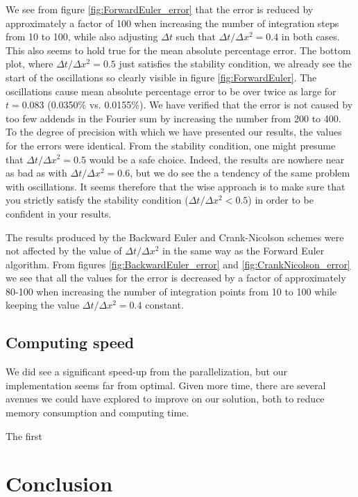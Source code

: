 \documentclass[reprint, english,notitlepage,nofootinbib]{revtex4-1}  %
\begin{document}
We see from figure \ref{fig:ForwardEuler_error} that the error is reduced by approximately a factor of 100 when increasing the number of integration steps from 10 to 100, while also adjusting \(\Delta t\) such that \(\Delta t / \Delta x^2 = 0.4\) in both cases. This also seems to hold true for the mean absolute percentage error. The bottom plot, where \(\Delta t / \Delta x^2 = 0.5\) just satisfies the stability condition, we already see the start of the oscillations so clearly visible in figure \ref{fig:ForwardEuler}. The oscillations cause mean absolute percentage error to be over twice as large for \(t = 0.083\) (0.0350\% vs. 0.0155\%). We have verified that the error is not caused by too few addends in the Fourier sum by increasing the number from 200 to 400. To the degree of precision with which we have presented our results, the values for the errors were identical.
From the stability condition, one might presume that \(\Delta t / \Delta x^2 = 0.5\) would be a safe choice. Indeed, the results are nowhere near as bad as with \(\Delta t / \Delta x^2 = 0.6\), but we do see the a tendency of the same problem with oscillations. It seems therefore that the wise approach is to make sure that you strictly satisfy the stability condition (\(\Delta t / \Delta x^2 < 0.5\)) in order to be confident in your results.

The results produced by the Backward Euler and Crank-Nicolson schemes were not affected by the value of \(\Delta t / \Delta x^2\) in the same way as the Forward Euler algorithm. From figures \ref{fig:BackwardEuler_error} and \ref{fig:CrankNicolson_error} we see that all the values for the error is decreased by a factor of approximately 80-100 when increasing the number of integration points from 10 to 100 while keeping the value \(\Delta t / \Delta x^2 = 0.4\) constant. 


\subsection*{Computing speed}

We did see a significant speed-up from the parallelization, but our implementation seems far from optimal. Given more time, there are several avenues we could have explored to improve on our solution, both to reduce memory consumption and computing time.

The first



\section{Conclusion}
\end{document}
